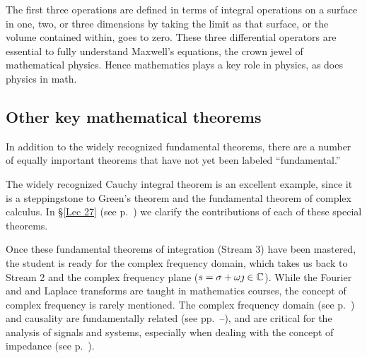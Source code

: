 \documentclass{ximera}
\begin{document}
The first three operations are defined in terms of integral operations on a surface in one, two, or three dimensions
by taking the limit as that surface, or the volume contained within, goes to zero.  These three differential operators are essential to fully understand Maxwell's equations, the crown jewel
of mathematical physics.  Hence mathematics plays a key role in physics, as does physics in math.
   
  

\subsection {Other key mathematical theorems}
In addition to the widely recognized fundamental theorems,
there are a number of equally important theorems that have not yet been labeled ``fundamental.''%

The widely recognized Cauchy integral theorem is an excellent example, since it is a steppingstone
to Green's theorem and the fundamental theorem of complex calculus.
In \S \ref{Lec 27} (see p.~\pageref{Lec 27})		 %
we clarify the contributions of each of these special theorems.  

Once these fundamental theorems of integration (Stream 3) have been mastered, the student is ready
for the complex frequency domain, which takes us back to Stream 2 and the
complex frequency plane ($s= \sigma+\omega\jmath \in \mathbb{C}$). 
While the Fourier and and Laplace transforms are taught in mathematics courses, the concept of complex
frequency is rarely mentioned.
The complex frequency domain (see p.~\pageref{LaplaceFrequency}) and causality are
fundamentally related (see pp.~\pageref{Lec 28}--\pageref{Lec 30}),
and are critical for the analysis of signals and systems, especially when dealing with the concept
of impedance (see p.~\pageref{Lec 25}).
\end{document}
